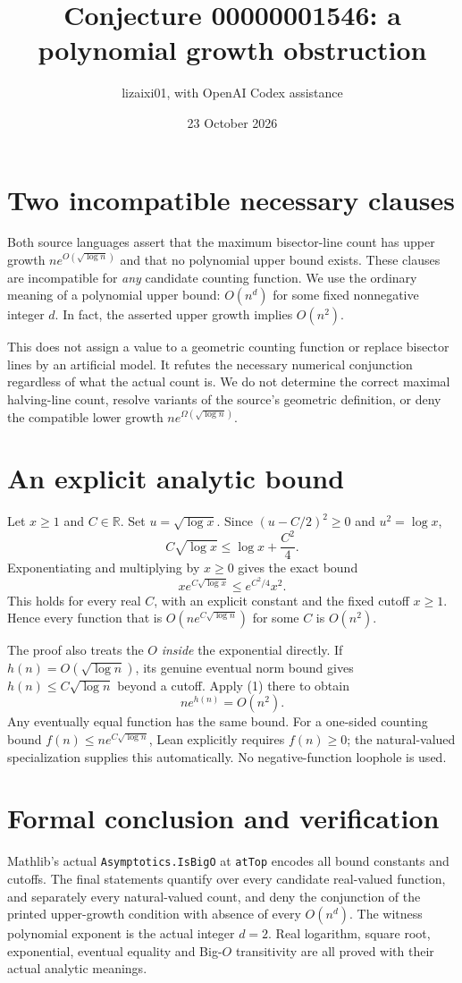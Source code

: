 \documentclass[10pt]{article}
\title{Conjecture 00000001546: a polynomial growth obstruction}
\author{lizaixi01, with OpenAI Codex assistance}
\date{23 October 2026}
\begin{document}
\maketitle
\section{Two incompatible necessary clauses}
Both source languages assert that the maximum bisector-line count
has upper growth $n e^{O(\sqrt{\log n})}$ and that no polynomial
upper bound exists. These clauses are incompatible for \emph{any}
candidate counting function. We use the ordinary meaning of a
polynomial upper bound: $O(n^d)$ for some fixed nonnegative integer
$d$. In fact, the asserted upper growth implies $O(n^2)$.

This does not assign a value to a geometric counting function or
replace bisector lines by an artificial model. It refutes the
necessary numerical conjunction regardless of what the actual
count is. We do not determine the correct maximal halving-line
count, resolve variants of the source's geometric definition, or
deny the compatible lower growth $n e^{\Omega(\sqrt{\log n})}$.

\section{An explicit analytic bound}
Let $x\ge1$ and $C\in\mathbb R$. Set $u=\sqrt{\log x}$.
Since $(u-C/2)^2\ge0$ and $u^2=\log x$,
\[
 C\sqrt{\log x}\le\log x+\frac{C^2}{4}.
\]
Exponentiating and multiplying by $x\ge0$ gives the exact bound
\[
 x e^{C\sqrt{\log x}}\le e^{C^2/4}x^2. \tag{1}
\]
This holds for every real $C$, with an explicit constant and the
fixed cutoff $x\ge1$. Hence every function that is
$O(n e^{C\sqrt{\log n}})$ for some $C$ is $O(n^2)$.

The proof also treats the $O$ \emph{inside} the exponential
directly. If $h(n)=O(\sqrt{\log n})$, its genuine eventual norm
bound gives $h(n)\le C\sqrt{\log n}$ beyond a cutoff. Apply (1)
there to obtain
\[
 n e^{h(n)}=O(n^2).
\]
Any eventually equal function has the same bound. For a one-sided
counting bound $f(n)\le n e^{C\sqrt{\log n}}$, Lean explicitly
requires $f(n)\ge0$; the natural-valued specialization supplies
this automatically. No negative-function loophole is used.

\section{Formal conclusion and verification}
Mathlib's actual \texttt{Asymptotics.IsBigO} at \texttt{atTop}
encodes all bound constants and cutoffs. The final statements
quantify over every candidate real-valued function, and separately
every natural-valued count, and deny the conjunction of the printed
upper-growth condition with absence of every $O(n^d)$. The witness
polynomial exponent is the actual integer $d=2$. Real logarithm,
square root, exponential, eventual equality and Big-$O$
transitivity are all proved with their actual analytic meanings.
\end{document}
